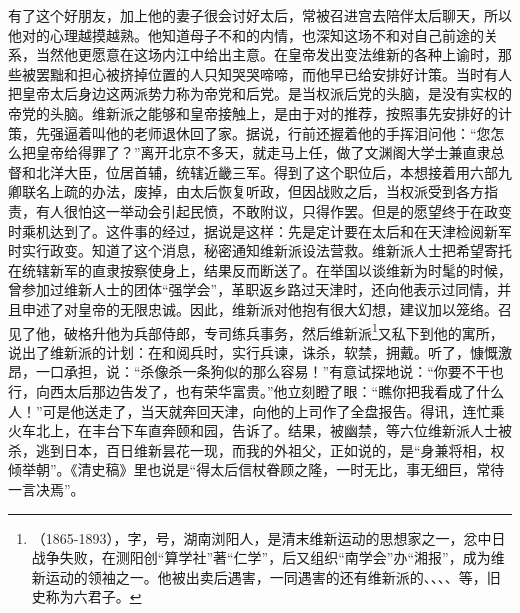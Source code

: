   有了这个好朋友，加上他的妻子很会讨好太后，常被召进宫去陪伴太后聊天，所以他对的心理越摸越熟。他知道母子不和的内情，也深知这场不和对自己前途的关系，当然他更愿意在这场内江中给出主意。在皇帝发出变法维新的各种上谕时，那些被罢黜和担心被挤掉位置的人只知哭哭啼啼，而他早已给安排好计策。当时有人把皇帝太后身边这两派势力称为帝党和后党。是当权派后党的头脑，是没有实权的帝党的头脑。维新派之能够和皇帝接触上，是由于对的推荐，按照事先安排好的计策，先强逼着叫他的老师退休回了家。据说，行前还握着他的手挥泪问他：“您怎么把皇帝给得罪了？”离开北京不多天，就走马上任，做了文渊阁大学士兼直隶总督和北洋大臣，位居首辅，统辖近畿三军。得到了这个职位后，本想接着用六部九卿联名上疏的办法，废掉，由太后恢复听政，但因战败之后，当权派受到各方指责，有人很怕这一举动会引起民愤，不敢附议，只得作罢。但是的愿望终于在政变时乘机达到了。这件事的经过，据说是这样：先是定计要在太后和在天津检阅新军时实行政变。知道了这个消息，秘密通知维新派设法营救。维新派人士把希望寄托在统辖新军的直隶按察使身上，结果反而断送了。在举国以谈维新为时髦的时候，曾参加过维新人士的团体“强学会”，革职返乡路过天津时，还向他表示过同情，并且申述了对皇帝的无限忠诚。因此，维新派对他抱有很大幻想，建议加以笼络。召见了他，破格升他为兵部侍郎，专司练兵事务，然后维新派\footnote{（1865-1893），字，号，湖南浏阳人，是清末维新运动的思想家之一，忿中日战争失败，在测阳创“算学社”著“仁学”，后又组织“南学会”办“湘报”，成为维新运动的领袖之一。他被出卖后遇害，一同遇害的还有维新派的、、、、等，旧史称为六君子。}又私下到他的寓所，说出了维新派的计划：在和阅兵时，实行兵谏，诛杀，软禁，拥戴。听了，慷慨激昂，一口承担，说：“杀像杀一条狗似的那么容易！”有意试探地说：“你要不干也行，向西太后那边告发了，也有荣华富贵。”他立刻瞪了眼：“瞧你把我看成了什么人！”可是他送走了，当天就奔回天津，向他的上司作了全盘报告。得讯，连忙乘火车北上，在丰台下车直奔颐和园，告诉了。结果，被幽禁，等六位维新派人士被杀，逃到日本，百日维新昙花一现，而我的外祖父，正如说的，是“身兼将相，权倾举朝”。《清史稿》里也说是“得太后信杖眷顾之隆，一时无比，事无细巨，常待一言决焉”。\\

